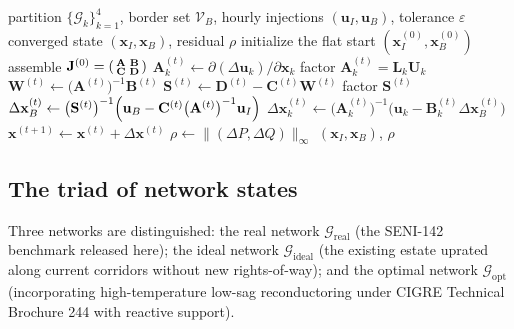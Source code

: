\begin{algorithm}[!t]
\caption{Schur-border AC power flow on the SENI-142 HBCF partition}
\label{alg:schur_pf}
\begin{algorithmic}[1]
\Require partition $\{\mathcal{G}_k\}_{k=1}^{4}$, border set $\mathcal{V}_B$,
         hourly injections $(\mathbf{u}_I, \mathbf{u}_B)$, tolerance $\varepsilon$
\Ensure converged state $(\mathbf{x}_I, \mathbf{x}_B)$, residual $\rho$
\State initialize the flat start $(\mathbf{x}_I^{(0)}, \mathbf{x}_B^{(0)})$
\State assemble $\mathbf{J}^{(0)} = \begin{psmallmatrix} \mathbf{A} & \mathbf{B} \\ \mathbf{C} & \mathbf{D} \end{psmallmatrix}$
   
     \State $\mathbf{A}_k^{(t)} \gets \partial (\Delta \mathbf{u}_k) / \partial \mathbf{x}_k$
     \State factor $\mathbf{A}_k^{(t)} = \mathbf{L}_k \mathbf{U}_k$ 
  \EndFor
  \State $\mathbf{W}^{(t)} \gets \bigl(\mathbf{A}^{(t)}\bigr)^{-1} \mathbf{B}^{(t)}$ 
  \State $\mathbf{S}^{(t)} \gets \mathbf{D}^{(t)} - \mathbf{C}^{(t)} \mathbf{W}^{(t)}$
  \State factor $\mathbf{S}^{(t)}$
  \State $\Delta \mathbf{x}_B^{(t)} \gets \bigl(\mathbf{S}^{(t)}\bigr)^{-1} \Bigl( \mathbf{u}_B - \mathbf{C}^{(t)} \bigl(\mathbf{A}^{(t)}\bigr)^{-1} \mathbf{u}_I \Bigr)$
   
     \State $\Delta \mathbf{x}_k^{(t)} \gets \bigl(\mathbf{A}_k^{(t)}\bigr)^{-1} \bigl( \mathbf{u}_k - \mathbf{B}_k^{(t)} \Delta \mathbf{x}_B^{(t)} \bigr)$
  \EndFor
  \State $\mathbf{x}^{(t+1)} \gets \mathbf{x}^{(t)} + \Delta \mathbf{x}^{(t)}$
  \State $\rho \gets \lVert (\Delta P, \Delta Q) \rVert_{\infty}$
\EndFor
\State \Return $(\mathbf{x}_I, \mathbf{x}_B)$, $\rho$ 
\end{algorithmic}
\end{algorithm}

\subsection{The triad of network states}
\label{sub:triad}

Three networks are distinguished: the real network $\mathcal{G}_{\mathrm{real}}$ (the SENI-142 benchmark released here); the ideal network $\mathcal{G}_{\mathrm{ideal}}$ (the existing estate uprated along current corridors without new rights-of-way); and the optimal network $\mathcal{G}_{\mathrm{opt}}$ (incorporating high-temperature low-sag reconductoring under CIGRE Technical Brochure 244 with reactive support).

